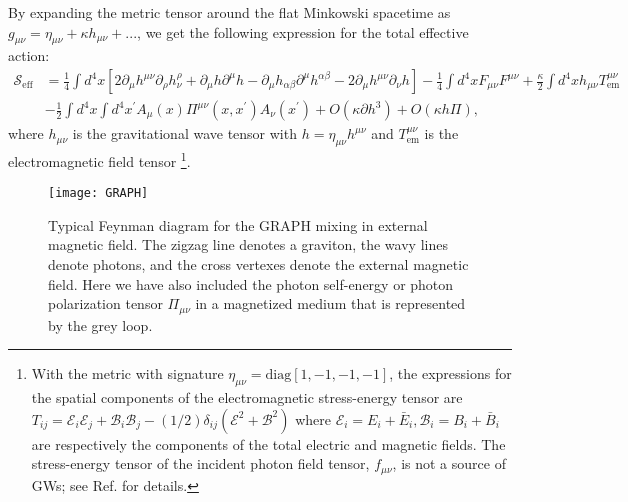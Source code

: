 \documentclass[a4paper,11pt]{article}
\begin{document}
 By expanding the metric tensor around the flat Minkowski spacetime as $g_{\mu\nu}=\eta_{\mu\nu}+\kappa h_{\mu\nu}+...$, we get the following expression for the total effective action: 
\begin{align}\label{tot-lang}
\mathcal S_\text{eff} & = \frac{1}{4}\int d^4 x \left[2\partial_\mu h^{\mu\nu}\partial_\rho h_\nu^\rho+\partial_\mu h\partial^\mu h-\partial_\mu h_{\alpha\beta}\partial^\mu h^{\alpha\beta}-2\partial_\mu h^{\mu\nu}\partial_\nu h\right]-\frac{1}{4}\int d^4 x F_{\mu\nu}F^{\mu\nu}+ \frac{\kappa}{2}\int d^4x h_{\mu\nu} T_\text{em}^{\mu\nu}\nonumber\\ & -\frac{1}{2}\int d^4 x\int d^4x^\prime A_\mu(x) \Pi^{\mu\nu}(x, x^\prime)A_\nu(x^\prime) + O(\kappa \partial h^3)+O(\kappa h \Pi),
\end{align}
where $h_{\mu\nu}$ is the gravitational wave tensor with $h=\eta_{\mu\nu}h^{\mu\nu}$ and $T_\text{em}^{\mu\nu}$ is the electromagnetic field tensor \footnote{With the metric with signature $\eta_{\mu\nu}=\text{diag}[1, -1, -1, -1]$, the expressions for the spatial components of the electromagnetic stress-energy tensor are $T_{ij}=\mathcal E_i \mathcal E_j + \mathcal B_i \mathcal B_j - (1/2)\delta_{ij}(\mathcal E^2+\mathcal B^2)$ where $\mathcal E_i=E_i+\bar E_i, \mathcal B_i=B_i+\bar B_i$ are respectively the components of the total electric and magnetic fields. The stress-energy tensor of the incident photon field tensor, $f_{\mu\nu}$, is not a source of GWs; see Ref. \cite{Boccaletti70} for details.}.


\begin{figure}[htbp]
\begin{center}
\texttt{[image: GRAPH]}
\caption{Typical Feynman diagram for the GRAPH mixing in external magnetic field. The zigzag line denotes a graviton, the wavy lines denote photons, and the cross vertexes denote the external magnetic field. Here we have also included the photon self-energy or photon polarization tensor $\Pi_{\mu\nu}$ in a magnetized medium that is represented by the grey loop.}
\label{Graphax}
\end{center}
\end{figure}
   
\end{document}
